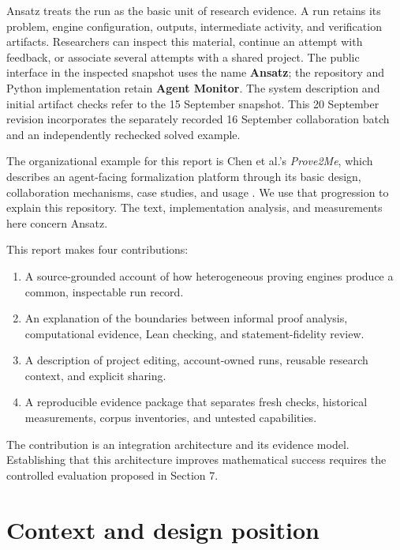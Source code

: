 \documentclass[10pt,letterpaper]{article}
\begin{document}
Ansatz treats the run as the basic unit of research evidence. A run retains its problem, engine configuration, outputs, intermediate activity, and verification artifacts. Researchers can inspect this material, continue an attempt with feedback, or associate several attempts with a shared project. The public interface in the inspected snapshot uses the name \textbf{Ansatz}; the repository and Python implementation retain \textbf{Agent Monitor}. The system description and initial artifact checks refer to the 15 September snapshot. This 20 September revision incorporates the separately recorded 16 September collaboration batch and an independently rechecked solved example.

The organizational example for this report is Chen et al.'s \emph{Prove2Me}, which describes an agent-facing formalization platform through its basic design, collaboration mechanisms, case studies, and usage \cite{prove2me}. We use that progression to explain this repository. The text, implementation analysis, and measurements here concern Ansatz.


This report makes four contributions:

\begin{enumerate}

\item A source-grounded account of how heterogeneous proving engines produce a common, inspectable run record.

\item An explanation of the boundaries between informal proof analysis, computational evidence, Lean checking, and statement-fidelity review.

\item A description of project editing, account-owned runs, reusable research context, and explicit sharing.

\item A reproducible evidence package that separates fresh checks, historical measurements, corpus inventories, and untested capabilities.

\end{enumerate}

The contribution is an integration architecture and its evidence model. Establishing that this architecture improves mathematical success requires the controlled evaluation proposed in Section 7.

\section{Context and design position}
\end{document}
